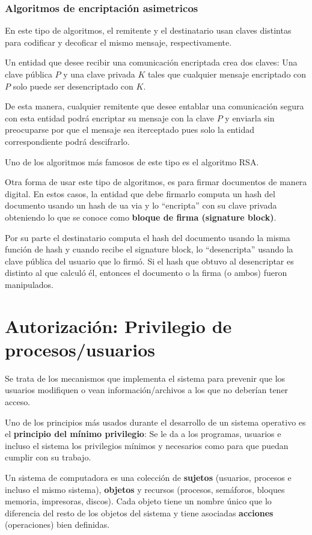 \subsubsection{Algoritmos de encriptación asimetricos}
En este tipo de algoritmos, el remitente y el destinatario usan claves distintas para codificar y decoficar el mismo mensaje, respectivamente.

Un entidad que desee recibir una comunicación encriptada crea dos claves: Una clave pública $P$ y una clave privada $K$ tales que cualquier mensaje encriptado con $P$ solo puede ser desencriptado con $K$.

De esta manera, cualquier remitente que desee entablar una comunicación segura con esta entidad podrá encriptar su mensaje con la clave $P$ y enviarla sin preocuparse por que el mensaje sea iterceptado pues solo la entidad correspondiente podrá descifrarlo.

Uno de los algoritmos más famosos de este tipo es el algoritmo RSA.

Otra forma de usar este tipo de algoritmos, es para firmar documentos de manera digital. En estos casos, la entidad que debe firmarlo computa un hash del documento usando un hash de ua via y lo ``encripta'' con su clave privada obteniendo lo que se conoce como \textbf{bloque de firma (signature block)}.

Por su parte el destinatario computa el hash del documento usando la misma función de hash y cuando recibe el signature block, lo ``desencripta'' usando la clave pública del usuario que lo firmó. Si el hash que obtuvo al desencriptar es distinto al que calculó él, entonces el documento o la firma (o ambos) fueron manipulados.

\newpage
\section{Autorización: Privilegio de procesos/usuarios}\label{privilegios}
Se trata de los mecanismos que implementa el sistema para prevenir que los usuarios modifiquen o vean información/archivos a los que no deberían tener acceso.

Uno de los principios más usados durante el desarrollo de un sistema operativo es el \textbf{principio del mínimo privilegio}: Se le da a los programas, usuarios e incluso el sistema los privilegios mínimos y necesarios como para que puedan cumplir con su trabajo.

Un sistema de computadora es una colección de \textbf{sujetos} (usuarios, procesos e incluso el mismo sistema), \textbf{objetos} y recursos (procesos, semáforos, bloques memoria, impresoras, discos). Cada objeto tiene un nombre único que lo diferencia del resto de los objetos del sistema y tiene asociadas \textbf{acciones} (operaciones) bien definidas.

